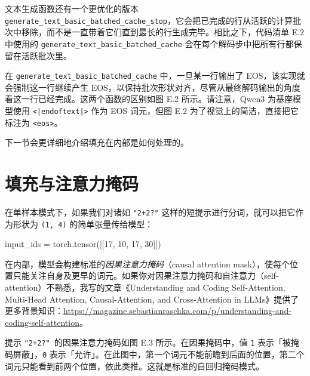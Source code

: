 文本生成函数还有一个更优化的版本 \texttt{generate\_text\_basic\_batched\_cache\_stop}，它会把已完成的行从活跃的计算批次中移除，而不是一直带着它们直到最长的行生成完毕。相比之下，代码清单 E.2 中使用的 \texttt{generate\_text\_basic\_batched\_cache} 会在每个解码步中把所有行都保留在活跃批次里。

在 \texttt{generate\_text\_basic\_batched\_cache} 中，一旦某一行输出了 EOS，该实现就会强制这一行继续产生 EOS，以保持批次形状对齐，尽管从最终解码输出的角度看这一行已经完成。这两个函数的区别如图 E.2 所示。请注意，Qwen3 为基座模型使用 \texttt{\textless{}|endoftext|\textgreater{}} 作为 EOS 词元，但图 E.2 为了视觉上的简洁，直接把它标注为 \texttt{\textless{}eos\textgreater{}}。


下一节会更详细地介绍填充在内部是如何处理的。

\section{填充与注意力掩码}

在单样本模式下，如果我们对诸如 \texttt{"}\texttt{2+2?}\texttt{"} 这样的短提示进行分词，就可以把它作为形状为 \texttt{(1, 4)} 的简单张量传给模型：

\begin{codebox}
input_ids = torch.tensor([[17, 10, 17, 30]])
\end{codebox}

在内部，模型会构建标准的\emph{因果注意力掩码}（causal attention mask），使每个位置只能关注自身及更早的词元。如果你对因果注意力掩码和自注意力（self-attention）不熟悉，我写的文章《Understanding and Coding Self-Attention, Multi-Head Attention, Causal-Attention, and Cross-Attention in LLMs》提供了更多背景知识：\href{https://magazine.sebastianraschka.com/p/understanding-and-coding-self-attention}{https://magazine.sebastianraschka.com/p/understanding-and-coding-self-attention}。

提示 \texttt{"}\texttt{2+2?}\texttt{"}\texttt{ }的因果注意力掩码如图 E.3 所示。在因果掩码中，值 \texttt{1} 表示「被掩码屏蔽」，\texttt{0} 表示「允许」。在此图中，第一个词元不能前瞻到后面的位置，第二个词元只能看到前两个位置，依此类推。这就是标准的自回归掩码模式。


